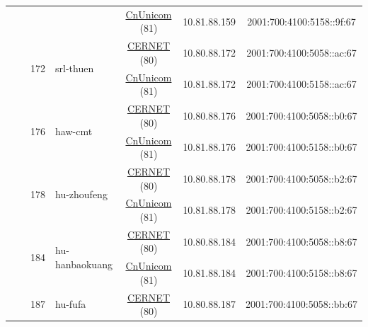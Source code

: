 \begin{small}
\begin{center}
\begin{longtable}{|c|c|c|c|c|c|c|c|}
  &  &  &  & \multicolumn{2}{|c|}{\tiny{\href{http://www.chinaunicom.com}{CnUnicom} (81)}} & \tiny{10.81.88.159} & \tiny{2001:700:4100:5158::9f:67} \\* \cline{3-3}\cline{4-4}\cline{5-5}\cline{6-6}\cline{7-7}\cline{8-8}
  &  & \multirow{2}{*}{\tiny{172}} & \multicolumn{1}{|l|}{\multirow{2}{*}{\tiny{srl-thuen}}} & \multicolumn{2}{|c|}{\tiny{\href{http://www.cernet.edu.cn}{CERNET} (80)}} & \tiny{10.80.88.172} & \tiny{2001:700:4100:5058::ac:67} \\* \cline{5-5}\cline{6-6}\cline{7-7}\cline{8-8}
  &  &  &  & \multicolumn{2}{|c|}{\tiny{\href{http://www.chinaunicom.com}{CnUnicom} (81)}} & \tiny{10.81.88.172} & \tiny{2001:700:4100:5158::ac:67} \\* \cline{3-3}\cline{4-4}\cline{5-5}\cline{6-6}\cline{7-7}\cline{8-8}
  &  & \multirow{2}{*}{\tiny{176}} & \multicolumn{1}{|l|}{\multirow{2}{*}{\tiny{haw-cmt}}} & \multicolumn{2}{|c|}{\tiny{\href{http://www.cernet.edu.cn}{CERNET} (80)}} & \tiny{10.80.88.176} & \tiny{2001:700:4100:5058::b0:67} \\* \cline{5-5}\cline{6-6}\cline{7-7}\cline{8-8}
  &  &  &  & \multicolumn{2}{|c|}{\tiny{\href{http://www.chinaunicom.com}{CnUnicom} (81)}} & \tiny{10.81.88.176} & \tiny{2001:700:4100:5158::b0:67} \\* \cline{3-3}\cline{4-4}\cline{5-5}\cline{6-6}\cline{7-7}\cline{8-8}
  &  & \multirow{2}{*}{\tiny{178}} & \multicolumn{1}{|l|}{\multirow{2}{*}{\tiny{hu-zhoufeng}}} & \multicolumn{2}{|c|}{\tiny{\href{http://www.cernet.edu.cn}{CERNET} (80)}} & \tiny{10.80.88.178} & \tiny{2001:700:4100:5058::b2:67} \\* \cline{5-5}\cline{6-6}\cline{7-7}\cline{8-8}
  &  &  &  & \multicolumn{2}{|c|}{\tiny{\href{http://www.chinaunicom.com}{CnUnicom} (81)}} & \tiny{10.81.88.178} & \tiny{2001:700:4100:5158::b2:67} \\* \cline{3-3}\cline{4-4}\cline{5-5}\cline{6-6}\cline{7-7}\cline{8-8}
  &  & \multirow{2}{*}{\tiny{184}} & \multicolumn{1}{|l|}{\multirow{2}{*}{\tiny{hu-hanbaokuang}}} & \multicolumn{2}{|c|}{\tiny{\href{http://www.cernet.edu.cn}{CERNET} (80)}} & \tiny{10.80.88.184} & \tiny{2001:700:4100:5058::b8:67} \\* \cline{5-5}\cline{6-6}\cline{7-7}\cline{8-8}
  &  &  &  & \multicolumn{2}{|c|}{\tiny{\href{http://www.chinaunicom.com}{CnUnicom} (81)}} & \tiny{10.81.88.184} & \tiny{2001:700:4100:5158::b8:67} \\* \cline{3-3}\cline{4-4}\cline{5-5}\cline{6-6}\cline{7-7}\cline{8-8}
  &  & \multirow{2}{*}{\tiny{187}} & \multicolumn{1}{|l|}{\multirow{2}{*}{\tiny{hu-fufa}}} & \multicolumn{2}{|c|}{\tiny{\href{http://www.cernet.edu.cn}{CERNET} (80)}} & \tiny{10.80.88.187} & \tiny{2001:700:4100:5058::bb:67} \\* \cline{5-5}\cline{6-6}\cline{7-7}\cline{8-8}

\end{longtable}
\end{center}
\end{small}

